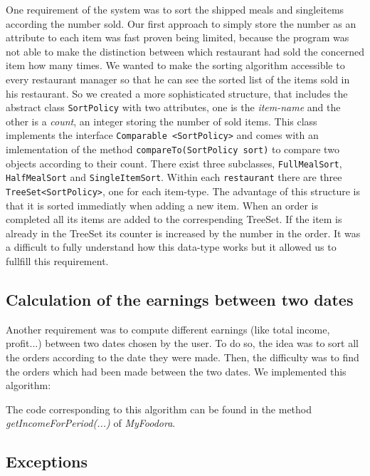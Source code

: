 One requirement of the system was to sort the shipped meals and singleitems according the 
number sold. Our first approach to simply store the number as an attribute to each item
was fast proven being limited, because the program was not able to make the distinction
between which restaurant had sold the concerned item how many times. We wanted to 
make the sorting algorithm accessible to every restaurant manager so that he can see  the 
sorted list of the items sold in his restaurant. So we created a more sophisticated 
structure, that includes the abstract class \lstinline|SortPolicy| with two attributes,
one is the \textit{item-name} and the other is a \textit{count}, an integer storing the number
of sold items.
This class implements the interface \lstinline|Comparable <SortPolicy>| and comes with 
an imlementation of the method \lstinline|compareTo(SortPolicy sort)| to compare two
objects according to their count. There exist three subclasses, \lstinline|FullMealSort|,
\lstinline|HalfMealSort| and \lstinline|SingleItemSort|. Within each 
\lstinline|restaurant| there are three \lstinline|TreeSet<SortPolicy>|, one for each 
item-type. The advantage of this structure is that it is sorted immediatly when adding a new 
item. When an order is completed all its items are added to the correspending TreeSet.
If the item is already in the TreeSet its counter is increased by the number in the 
order. It was a difficult to fully understand how this data-type works but it allowed us
to fullfill this requirement.

\subsection{Calculation of the earnings between two dates}
\label{calculation-between-2-dates}
Another requirement was to compute different earnings (like total income, profit...) between two dates chosen by the user. To do so, the idea was to sort all the orders according to the date they were made. Then, the difficulty was to find the orders which had been made between the two dates. We implemented this algorithm:

The code corresponding to this algorithm can be found in the method \textit{getIncomeForPeriod(...)} of \textit{MyFoodora}.

\subsection{Exceptions}
\label{sub:exceptions}

